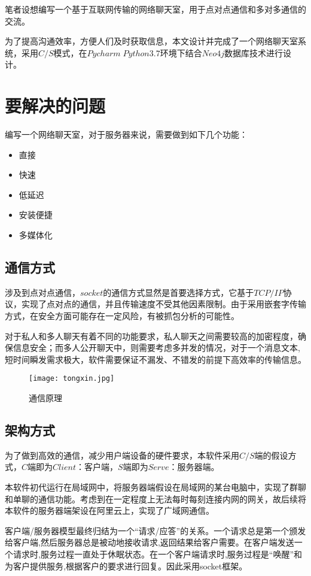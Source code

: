 \documentclass[forprint]{sql}
\begin{document}
笔者设想编写一个基于互联网传输的网络聊天室，用于点对点通信和多对多通信的交流。

为了提高沟通效率，方便人们及时获取信息，本文设计并完成了一个网络聊天室系统，采用$  C/S  $模式，在$ Pycharm \; Python3.7 $环境下结合$ Neo4j $数据库技术进行设计。

\section{要解决的问题}

编写一个网络聊天室，对于服务器来说，需要做到如下几个功能：

\begin{itemize}
	\item 直接
	\item 快速
	\item 低延迟
	\item 安装便捷
	\item 多媒体化
\end{itemize}

\subsection{通信方式}
涉及到点对点通信，$socket$的通信方式显然是首要选择方式，它基于$TCP/IP$协议，实现了点对点的通信，并且传输速度不受其他因素限制。由于采用嵌套字传输方式，在安全方面可能存在一定风险，有被抓包分析的可能性。

对于私人和多人聊天有着不同的功能要求，私人聊天之间需要较高的加密程度，确保信息安全；而多人公开聊天中，则需要考虑多并发的情况，对于一个消息文本,短时间瞬发需求极大，软件需要保证不漏发、不错发的前提下高效率的传输信息。
\begin{figure}[ht]
	\centering
	\texttt{[image: tongxin.jpg]}
	\caption{通信原理}
	\label{fig:4}
	
\end{figure}

\subsection{架构方式}
为了做到高效的通信，减少用户端设备的硬件要求，本软件采用$ C/S $端的假设方式，$ C $端即为$ Client $：客户端，$ S $端即为$ Serve $：服务器端。

本软件初代运行在局域网中，将服务器端假设在局域网的某台电脑中，实现了群聊和单聊的通信功能。考虑到在一定程度上无法每时每刻连接内网的网关，故后续将本软件的服务器端架设在阿里云上，实现了广域网通信。


客户端/服务器模型最终归结为一个“请求/应答”的关系。一个请求总是第一个颁发给客户端,然后服务器总是被动地接收请求,返回结果给客户需要。在客户端发送一个请求时,服务过程一直处于休眠状态。在一个客户端请求时,服务过程是“唤醒”和为客户提供服务,根据客户的要求进行回复。因此采用socket框架。
\end{document}
